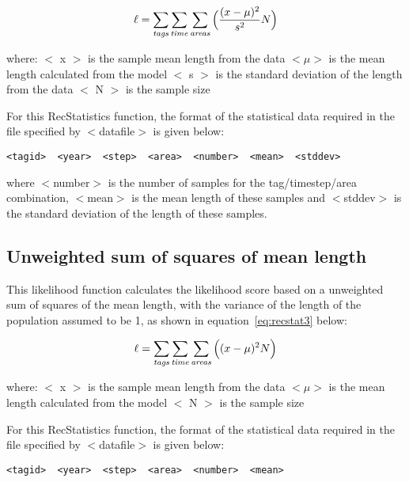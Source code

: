 \documentclass [a4paper, 10pt]{book}
\begin{document}
\begin{equation}\label{eq:recstat2}
\ell = \sum_{\it tags}\sum_{\it time}\sum_{\it areas} \Big(\frac{(x-\mu)^2} {s^2} N\Big)
\end{equation}

where:\newline
$<$ x $>$ is the sample mean length from the data\newline
$<\mu>$ is the mean length calculated from the model\newline
$<$ s $>$ is the standard deviation of the length from the data\newline
$<$ N $>$ is the sample size

\bigskip
For this RecStatistics function, the format of the statistical data required in the file specified by $<$datafile$>$ is given below:

{\small\begin{verbatim}
<tagid>  <year>  <step>  <area>  <number>  <mean>  <stddev>
\end{verbatim}}

where $<$number$>$ is the number of samples for the tag/timestep/area combination, $<$mean$>$ is the mean length of these samples and $<$stddev$>$ is the standard deviation of the length of these samples.

\subsection{Unweighted sum of squares of mean length}
This likelihood function calculates the likelihood score based on a unweighted sum of squares of the mean length, with the variance of the length of the population assumed to be 1, as shown in equation~\ref{eq:recstat3} below:

\begin{equation}\label{eq:recstat3}
\ell = \sum_{\it tags}\sum_{\it time}\sum_{\it areas} \Big((x-\mu)^2 N\Big)
\end{equation}

where:\newline
$<$ x $>$ is the sample mean length from the data\newline
$<\mu>$ is the mean length calculated from the model\newline
$<$ N $>$ is the sample size

\bigskip
For this RecStatistics function, the format of the statistical data required in the file specified by $<$datafile$>$ is given below:

{\small\begin{verbatim}
<tagid>  <year>  <step>  <area>  <number>  <mean>
\end{verbatim}}
\end{document}
